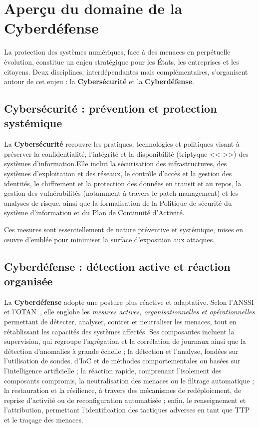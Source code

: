 \section{Aperçu du domaine de la Cyberdéfense}\label{sec:cyberdef-panorama}

La protection des systèmes numériques, face à des menaces en perpétuelle évolution, constitue un enjeu stratégique pour les États, les entreprises et les citoyens. Deux disciplines, interdépendantes mais complémentaires, s'organisent autour de cet enjeu : la \textbf{Cybersécurité} et la \textbf{Cyberdéfense}.

\subsection*{Cybersécurité : prévention et protection systémique}

La \textbf{Cybersécurité} recouvre les pratiques, technologies et politiques visant à préserver la confidentialité, l'intégrité et la disponibilité (triptyque <<  >>) des systèmes d'information.Elle inclut la sécurisation des infrastructures, des systèmes d'exploitation et des réseaux, le contrôle d'accès et la gestion des identités, le chiffrement et la protection des données en transit et au repos, la gestion des vulnérabilités (notamment à travers le patch management) et les analyses de risque, ainsi que la formalisation de la Politique de sécurité du système d'information et du Plan de Continuité d'Activité.

Ces mesures sont essentiellement de nature préventive et systémique, mises en œuvre d'emblée pour minimiser la surface d'exposition aux attaques.

\subsection*{Cyberdéfense : détection active et réaction organisée}

La \textbf{Cyberdéfense} adopte une posture plus réactive et adaptative. Selon l'\ac{ANSSI} et l'\ac{OTAN}~\cite{ANSSI2024,NATO2016Cyberdef}, elle englobe les \emph{mesures actives, organisationnelles et opérationnelles} permettant de détecter, analyser, contrer et neutraliser les menaces, tout en rétablissant les capacités des systèmes affectés. Ses composantes incluent la supervision, qui regroupe l'agrégation et la corrélation de journaux ainsi que la détection d'anomalies à grande échelle ; la détection et l'analyse, fondées sur l'utilisation de sondes, d'\ac{IoC} et de méthodes comportementales ou basées sur l'intelligence artificielle ; la réaction rapide, comprenant l'isolement des composants compromis, la neutralisation des menaces ou le filtrage automatique ; la restauration et la résilience, à travers des mécanismes de redéploiement, de reprise d'activité ou de reconfiguration automatisée ; enfin, le renseignement et l'attribution, permettant l'identification des tactiques adverses en tant que \ac{TTP} et le traçage des menaces.

